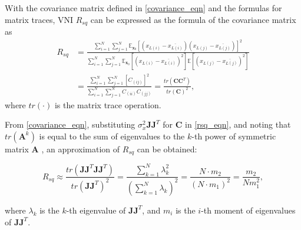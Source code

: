 

With the covariance matrix defined in \eqref{covariance_eqn} and the formulas for matrix traces, VNI $R_{sq}$ can be expressed as the formula of the covariance matrix as
\begin{equation}
    \begin{aligned}
    R_{sq}
    &=\frac{
    \sum_{i=1}^N\sum_{j=1}^N\mathbb{E}_{\mathbf{x}_0}
    [(x_{L(i)}-\overline{x_{L(i)}})(x_{L(j)}-\overline{x_{L(j)}})]^2
    }{
    \sum_{i=1}^N\sum_{j=1}^N
    \mathbb{E}_{\mathbf{x}_0}[(x_{L(i)}-\overline{x_{L(i)}})^2]
    \mathbb{E}[(x_{L(j)}-\overline{x_{L(j)}})^2]
    }\\
    &=
    \frac{\sum_{i=1}^N\sum_{j=1}^N[C_{(ij)}]^2}
    {\sum_{i=1}^N\sum_{j=1}^NC_{(ii)}C_{(jj)}}
    =
    \frac{tr(\mathbf{C}{\mathbf{C}}^T)}
    {tr(\mathbf{C})^2}
    ,
    \end{aligned}
    \label{rsq_eqn}
\end{equation}
where $tr(\cdot)$ is the matrix trace operation.

From \eqref{covariance_eqn}, substituting $\sigma_x^2\mathbf{JJ}^T$ for $\mathbf{C}$ in \eqref{rsq_eqn}, and noting that $tr(\mathbf{A}^k)$ is equal to the sum of eigenvalues to the $k$-th power of symmetric matrix $\mathbf{A}$ \cite{matrix}, an approximation of $R_{sq}$ can be obtained:

\begin{equation}
    R_{sq}\approx
    \frac{tr(\mathbf{JJ}^T\mathbf{JJ}^T)}{tr(\mathbf{JJ}^T)^2}
    =\frac{\sum_{k=1}^N\lambda_k^2}{(\sum_{k=1}^N\lambda_k)^2}
    =\frac{N\cdot m_2}{(N\cdot m_1)^2}
    =\frac{m_2}{Nm_1^2},
    \label{rsq_eigen}
\end{equation}

where $\lambda_k$ is the $k$-th eigenvalue of $\mathbf{JJ}^T$, and $m_i$ is the $i$-th moment of eigenvalues of $\mathbf{JJ}^T$.



